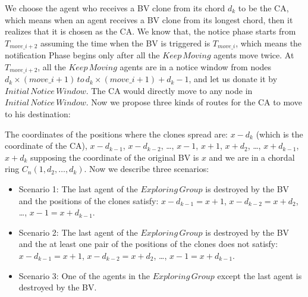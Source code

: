 \documentclass[conference]{IEEEtran}
\begin{document}

We choose the agent who receives a BV clone from its chord $d_k$ to be the CA, which means when an agent receives a BV clone from its longest chord, then it realizes that it is chosen as the CA. We know that, the notice phase starts from $T_{move\_{i+2}}$ assuming the time when the BV is triggered is $T_{move\_i}$, which means the notification Phase begins only after all the $Keep\,Moving$ agents move twice. At $T_{move\_{i+2}}$, all the $Keep\,Moving$ agents are in a notice window from nodes $d_k\times(move\_{i}+1)\,to\,d_k\times(move\_{i}+1) + d_{k}-1$, and let us donate it by $Initial\,Notice\,Window$. The CA would directly move to any node in $Initial\,Notice\,Window$. Now we propose three kinds of routes for the CA to move to his destination:

The coordinates of the positions where the clones spread are: $x-d_k$ (which is the coordinate of the CA), $x-d_{k-1}$, $x-d_{k-2}$, \ldots, $x-1$, $x+1$, $x+d_2$, \ldots, $x+d_{k-1}$, $x+d_{k}$ supposing the coordinate of the original BV is $x$ and we are in a chordal ring $C_n(1, d_2,\ldots, d_k)$.
 Now we describe three scenarios:
\begin{itemize}
\item Scenario 1: The last agent of the $Exploring\,Group$ is destroyed by the BV and the positions of the clones satisfy: $x-d_{k-1}=x+1$, $x-d_{k-2}=x+d_2$, \ldots, $x-1=x+d_{k-1}$. 
\item Scenario 2: The last agent of the $Exploring\,Group$ is destroyed by the BV and the at least one pair of the positions of the clones does not satisfy: $x-d_{k-1}=x+1$, $x-d_{k-2}=x+d_2$, \ldots, $x-1=x+d_{k-1}$. 
\item Scenario 3: One of the agents in the $Exploring\,Group$ except the last agent is destroyed by the BV.
\end{itemize}
\end{document}
